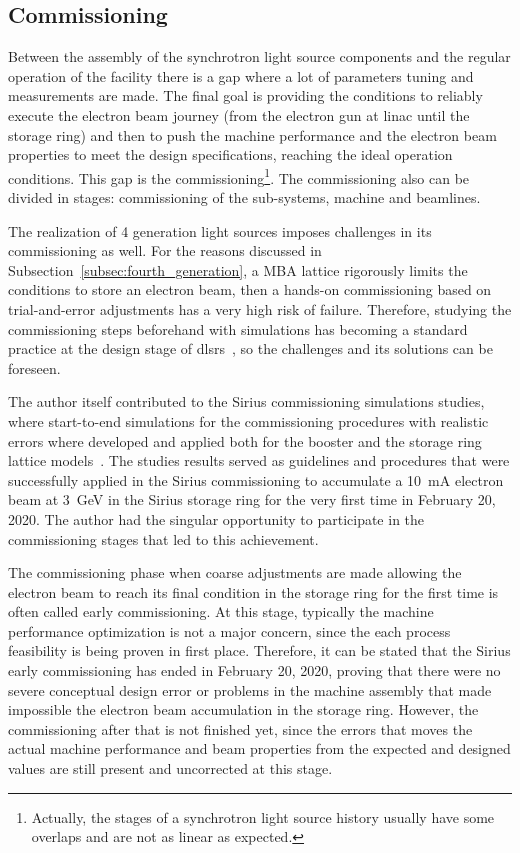 \subsection{Commissioning}
Between the assembly of the synchrotron light source components and the regular operation of the facility there is a gap where a lot of parameters tuning and measurements are made. The final goal is providing the conditions to reliably execute the electron beam journey (from the electron gun at \gls{linac} until the storage ring) and then to push the machine performance and the electron beam properties to meet the design specifications, reaching the ideal operation conditions. This gap is the commissioning\footnote{Actually, the stages of a synchrotron light source history usually have some overlaps and are not as linear as expected.}. The commissioning also can be divided in stages: commissioning of the sub-systems, machine and beamlines.

The realization of 4 generation light sources imposes challenges in its commissioning as well. For the reasons discussed in Subsection~\ref{subsec:fourth_generation}, a MBA lattice rigorously limits the conditions to store an electron beam, then a hands-on commissioning based on trial-and-error adjustments has a very high risk of failure. Therefore, studying the commissioning steps beforehand with simulations has becoming a standard practice at the design stage of \glspl{dlsr}~\cite{sajaev2015, liuzzo2017, ghasem2019, sajaev2019, hellert2019}, so the challenges and its solutions can be foreseen. 

The author itself contributed to the Sirius commissioning simulations studies, where start-to-end simulations for the commissioning procedures with realistic errors where developed and applied both for the booster and the storage ring lattice models~\cite{alves2019}. The studies results served as guidelines and procedures that were successfully applied in the Sirius commissioning to accumulate a \SI{10}{\milli\ampere} electron beam at \SI{3}{\giga\electronvolt} in the Sirius storage ring for the very first time in February 20, 2020. The author had the singular opportunity to participate in the commissioning stages that led to this achievement.

The commissioning phase when coarse adjustments are made allowing the electron beam to reach its final condition in the storage ring for the first time is often called early commissioning. At this stage, typically the machine performance optimization is not a major concern, since the each process feasibility is being proven in first place. Therefore, it can be stated that the Sirius early commissioning has ended in February 20, 2020, proving that there were no severe conceptual design error or problems in the machine assembly that made impossible the electron beam accumulation in the storage ring. However, the commissioning after that is not finished yet, since the errors that moves the actual machine performance and beam properties from the expected and designed values are still present and uncorrected at this stage.

